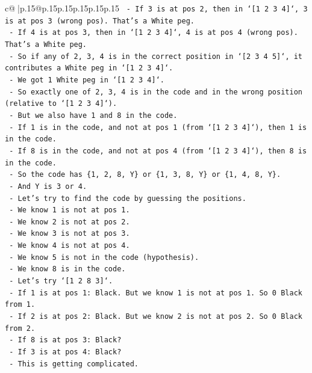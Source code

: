 \documentclass{article}
\begin{document}
{\begin{supertabular}{c@{$\;$}|p{.15\linewidth}@{}p{.15\linewidth}p{.15\linewidth}p{.15\linewidth}p{.15\linewidth}p{.15\linewidth}}
{{{\texttt{  {-} If 3 is at pos 2, then in `{[}1 2 3 4{]}`, 3 is at pos 3 (wrong pos). That's a White peg.} \\
\texttt{  {-} If 4 is at pos 3, then in `{[}1 2 3 4{]}`, 4 is at pos 4 (wrong pos). That's a White peg.} \\
\texttt{  {-} So if any of 2, 3, 4 is in the correct position in `{[}2 3 4 5{]}`, it contributes a White peg in `{[}1 2 3 4{]}`.} \\
\texttt{  {-} We got 1 White peg in `{[}1 2 3 4{]}`.} \\
\texttt{  {-} So exactly one of 2, 3, 4 is in the code and in the wrong position (relative to `{[}1 2 3 4{]}`).} \\
\texttt{  {-} But we also have 1 and 8 in the code.} \\
\texttt{  {-} If 1 is in the code, and not at pos 1 (from `{[}1 2 3 4{]}`), then 1 is in the code.} \\
\texttt{  {-} If 8 is in the code, and not at pos 4 (from `{[}1 2 3 4{]}`), then 8 is in the code.} \\
\texttt{  {-} So the code has \{1, 2, 8, Y\} or \{1, 3, 8, Y\} or \{1, 4, 8, Y\}.} \\
\texttt{  {-} And Y is 3 or 4.} \\
\texttt{  {-} Let's try to find the code by guessing the positions.} \\
\texttt{  {-} We know 1 is not at pos 1.} \\
\texttt{  {-} We know 2 is not at pos 2.} \\
\texttt{  {-} We know 3 is not at pos 3.} \\
\texttt{  {-} We know 4 is not at pos 4.} \\
\texttt{  {-} We know 5 is not in the code (hypothesis).} \\
\texttt{  {-} We know 8 is in the code.} \\
\texttt{  {-} Let's try `{[}1 2 8 3{]}`.} \\
\texttt{    {-} If 1 is at pos 1: Black. But we know 1 is not at pos 1. So 0 Black from 1.} \\
\texttt{    {-} If 2 is at pos 2: Black. But we know 2 is not at pos 2. So 0 Black from 2.} \\
\texttt{    {-} If 8 is at pos 3: Black?} \\
\texttt{    {-} If 3 is at pos 4: Black?} \\
\texttt{    {-} This is getting complicated.} \\
\\ 
}}}
\end{supertabular}}
\end{document}
